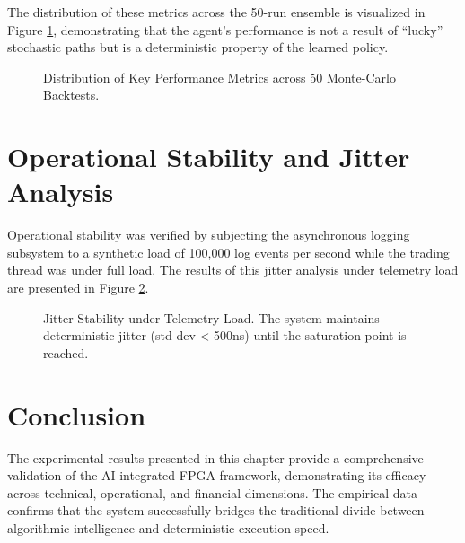 The distribution of these metrics across the 50-run ensemble is visualized in Figure \ref{fig:metric_distributions}, demonstrating that the agent's performance is not a result of ``lucky'' stochastic paths but is a deterministic property of the learned policy.

\begin{figure}
    \centering
    
    \caption{Distribution of Key Performance Metrics across 50 Monte-Carlo Backtests.}
    \label{fig:metric_distributions}
\end{figure}
\clearpage

\section{Operational Stability and Jitter Analysis}
Operational stability was verified by subjecting the asynchronous logging subsystem to a synthetic load of 100,000 log events per second while the trading thread was under full load. The results of this jitter analysis under telemetry load are presented in Figure \ref{fig:stability_jitter}.

\begin{figure}
    \centering
    
    \caption{Jitter Stability under Telemetry Load. The system maintains deterministic jitter (std dev < 500ns) until the saturation point is reached.}
    \label{fig:stability_jitter}
\end{figure}
\clearpage

\section{Conclusion}
The experimental results presented in this chapter provide a comprehensive validation of the AI-integrated FPGA framework, demonstrating its efficacy across technical, operational, and financial dimensions. The empirical data confirms that the system successfully bridges the traditional divide between algorithmic intelligence and deterministic execution speed.

